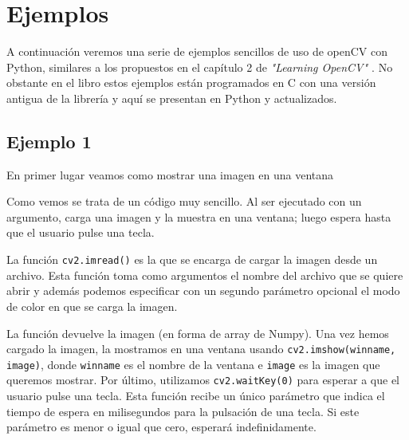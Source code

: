 \documentclass[a4paper,openright, 12pt]{book}
\begin{document}
\section{Ejemplos}
A continuación veremos una serie de ejemplos sencillos de uso de openCV con Python, similares a los propuestos en el capítulo 2 de \textit{"Learning OpenCV" \cite{oreilly}}. No obstante en el libro estos ejemplos están programados en C con una versión antigua de la librería y aquí se presentan en Python y actualizados.
\subsection*{Ejemplo 1}
En primer lugar veamos como mostrar una imagen en una ventana

Como vemos se trata de un código muy sencillo. Al ser ejecutado con un argumento, carga una imagen y la muestra en una ventana; luego espera hasta que el usuario pulse una tecla.

La función \lstinline|cv2.imread()| es la que se encarga de cargar la imagen desde un archivo.  Esta función toma como argumentos el nombre del archivo que se quiere abrir y además podemos especificar con un segundo parámetro opcional el modo de color en que se carga la imagen.

La función devuelve la imagen (en forma de array de Numpy).
\newline
Una vez hemos cargado la imagen, la mostramos en una ventana usando \lstinline|cv2.imshow(winname, image)|, donde \lstinline|winname| es el nombre de la ventana e \lstinline|image| es la imagen que queremos mostrar.
Por último, utilizamos \lstinline|cv2.waitKey(0)| para esperar a que el usuario pulse una tecla. Esta función recibe un único parámetro que indica el tiempo de espera en milisegundos para la pulsación de una tecla. Si este parámetro es menor o igual que cero, esperará indefinidamente.

\newpage
\end{document}
